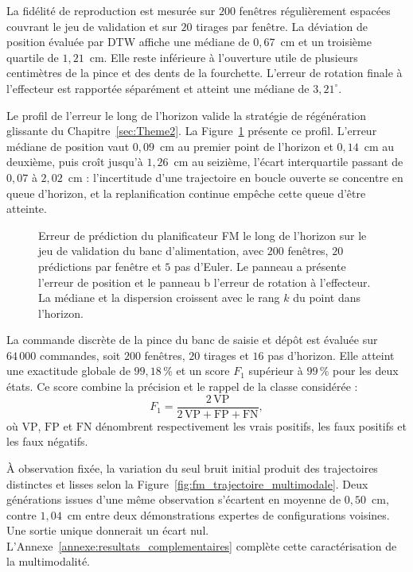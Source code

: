La fidélité de reproduction est mesurée sur $200$ fenêtres régulièrement espacées couvrant le jeu de validation et sur $20$ tirages par fenêtre. La déviation de position évaluée par \ac{DTW} affiche une médiane de $0{,}67$~cm et un troisième quartile de $1{,}21$~cm. Elle reste inférieure à l'ouverture utile de plusieurs centimètres de la pince et des dents de la fourchette. L'erreur de rotation finale à l'effecteur est rapportée séparément et atteint une médiane de $3{,}21^\circ$.

Le profil de l'erreur le long de l'horizon valide la stratégie de régénération glissante du Chapitre~\ref{sec:Theme2}. La Figure~\ref{fig:fm_horizon} présente ce profil. L'erreur médiane de position vaut $0{,}09$~cm au premier point de l'horizon et $0{,}14$~cm au deuxième, puis croît jusqu'à $1{,}26$~cm au seizième, l'écart interquartile passant de $0{,}07$ à $2{,}02$~cm : l'incertitude d'une trajectoire en boucle ouverte se concentre en queue d'horizon, et la replanification continue empêche cette queue d'être atteinte.

\begin{figure}[!htbp]
    \centering
    
    \caption{Erreur de prédiction du planificateur \ac{FM} le 
    long de l'horizon sur le jeu de validation du banc d'alimentation, avec $200$ fenêtres, $20$ prédictions par fenêtre et $5$ pas d'Euler. Le panneau a présente l'erreur de position et le panneau b l'erreur de rotation à l'effecteur. La médiane et la dispersion croissent avec le rang $k$ du point dans l'horizon.}\label{fig:fm_horizon}
\end{figure}

La commande discrète de la pince du banc de saisie et dépôt est évaluée sur $64\,000$ commandes, soit $200$ fenêtres, $20$ tirages et $16$ pas d'horizon. Elle atteint une exactitude globale de $99{,}18\,\%$ et un score $F_1$ supérieur à $99\,\%$ pour les deux états. Ce score combine la précision et le rappel de la classe considérée :
\begin{equation}\label{eq:F1score}
    F_1 = \frac{2\,\mathrm{VP}}{2\,\mathrm{VP} + \mathrm{FP} + \mathrm{FN}},
\end{equation}
où $\mathrm{VP}$, $\mathrm{FP}$ et $\mathrm{FN}$ dénombrent respectivement les vrais positifs, les faux positifs et les faux négatifs.

À observation fixée, la variation du seul bruit initial produit des trajectoires distinctes et lisses selon la Figure~\ref{fig:fm_trajectoire_multimodale}. Deux générations issues d'une même observation s'écartent en moyenne de $0{,}50$~cm, contre $1{,}04$~cm entre deux démonstrations expertes de configurations voisines. Une sortie unique donnerait un écart nul. L'Annexe~\ref{annexe:resultats_complementaires} complète cette caractérisation de la multimodalité.

